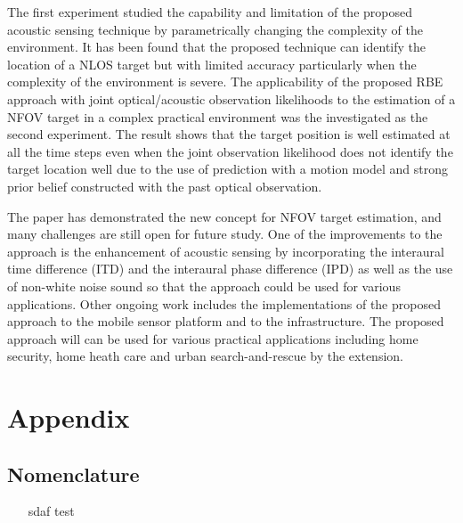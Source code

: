 The first experiment studied the capability and limitation of the proposed acoustic sensing technique by parametrically changing the complexity of the environment.  It has been found that the proposed technique can identify the location of a NLOS target but with limited accuracy particularly when the complexity of the environment is severe.  The applicability of the proposed RBE approach with joint optical/acoustic observation likelihoods to the estimation of a NFOV target in a complex practical environment was the investigated as the second experiment.  The result shows that the target position is well estimated at all the time steps even when the joint observation likelihood does not identify the target location well due to the use of prediction with a motion model and strong prior belief constructed with the past optical observation.  

The paper has demonstrated the new concept for NFOV target estimation, and many challenges are still open for future study.  One of the improvements to the approach is the enhancement of acoustic sensing by incorporating the interaural time difference (ITD) and the interaural phase difference (IPD) as well as the use of non-white noise sound so that the approach could be used for various applications.  Other ongoing work includes the implementations of the proposed approach to the mobile sensor platform and to the infrastructure.  The proposed approach will can be used for various practical applications including home security, home heath care and urban search-and-rescue by the extension.  



\appendix
\section*{Appendix}
\subsection*{Nomenclature}
\printnomenclature
\begin{itemize}
\item [sdaf] test
\end{itemize}


